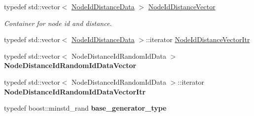 \begin{DoxyCompactItemize}
\item 
\hypertarget{namespaceall__distance__sketch_a21b129900de9d9cfbb3406f7e0d1a75a}{}typedef std\+::vector$<$ \hyperlink{classall__distance__sketch_1_1NodeIdDistanceData}{Node\+Id\+Distance\+Data} $>$ \hyperlink{namespaceall__distance__sketch_a21b129900de9d9cfbb3406f7e0d1a75a}{Node\+Id\+Distance\+Vector}\label{namespaceall__distance__sketch_a21b129900de9d9cfbb3406f7e0d1a75a}

\begin{DoxyCompactList}\small\item\em Container for node id and distance. \end{DoxyCompactList}\item 
typedef std\+::vector$<$ \hyperlink{classall__distance__sketch_1_1NodeIdDistanceData}{Node\+Id\+Distance\+Data} $>$\+::iterator \hyperlink{namespaceall__distance__sketch_aeb3aa8f88e2ff80d4625d227ad385dae}{Node\+Id\+Distance\+Vector\+Itr}
\item 
\hypertarget{namespaceall__distance__sketch_aba91dd69245d43d635e9aa605e31d85e}{}typedef std\+::vector$<$ Node\+Distance\+Id\+Random\+Id\+Data $>$ {\bfseries Node\+Distance\+Id\+Random\+Id\+Data\+Vector}\label{namespaceall__distance__sketch_aba91dd69245d43d635e9aa605e31d85e}

\item 
\hypertarget{namespaceall__distance__sketch_ab3b8677a1a08a8cd393e4dc0cc0f90e2}{}typedef std\+::vector$<$ Node\+Distance\+Id\+Random\+Id\+Data $>$\+::iterator {\bfseries Node\+Distance\+Id\+Random\+Id\+Data\+Vector\+Itr}\label{namespaceall__distance__sketch_ab3b8677a1a08a8cd393e4dc0cc0f90e2}

\item 
\hypertarget{namespaceall__distance__sketch_afd0190bdb1b259b86910f87a565d592d}{}typedef boost\+::minstd\+\_\+rand {\bfseries base\+\_\+generator\+\_\+type}\label{namespaceall__distance__sketch_afd0190bdb1b259b86910f87a565d592d}

\end{DoxyCompactItemize}
